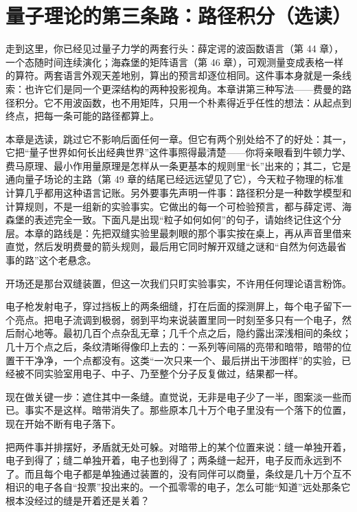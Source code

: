 \chapter{量子理论的第三条路：路径积分（选读）}

走到这里，你已经见过量子力学的两套行头：薛定谔的波函数语言（第 44 章），一个态随时间连续演化；海森堡的矩阵语言（第 46 章），可观测量变成表格一样的算符。两套语言外观天差地别，算出的预言却逐位相同。这件事本身就是一条线索：也许它们是同一个更深结构的两种投影视角。本章讲第三种写法——费曼的路径积分。它不用波函数，也不用矩阵，只用一个朴素得近乎任性的想法：从起点到终点，把每一条可能的路径都算上。

本章是选读，跳过它不影响后面任何一章。但它有两个别处给不了的好处：其一，它把“量子世界如何长出经典世界”这件事照得最清楚——你将亲眼看到牛顿力学、费马原理、最小作用量原理是怎样从一条更基本的规则里“长”出来的；其二，它是通向量子场论的主路（第 49 章的结尾已经远远望见了它），今天粒子物理的标准计算几乎都用这种语言记账。另外要事先声明一件事：路径积分是一种数学模型和计算规则，不是一组新的实验事实。它做出的每一个可检验预言，都与薛定谔、海森堡的表述完全一致。下面凡是出现“粒子如何如何”的句子，请始终记住这个分层。本章的路线是：先把双缝实验里最刺眼的那个事实按在桌上，再从声音里借来直觉，然后发明费曼的箭头规则，最后用它同时解开双缝之谜和“自然为何选最省事的路”这个老悬念。


开场还是那台双缝装置，但这一次我们只盯实验事实，不许用任何理论语言粉饰。

电子枪发射电子，穿过挡板上的两条细缝，打在后面的探测屏上，每个电子留下一个亮点。把电子流调到极弱，弱到平均来说装置里同一时刻至多只有一个电子，然后耐心地等。最初几百个点杂乱无章；几千个点之后，隐约露出深浅相间的条纹；几十万个点之后，条纹清晰得像印上去的：一系列等间隔的亮带和暗带，暗带的位置干干净净，一个点都没有。这类“一次只来一个、最后拼出干涉图样”的实验，已经被不同实验室用电子、中子、乃至整个分子反复做过，结果都一样。

现在做关键一步：遮住其中一条缝。直觉说，无非是电子少了一半，图案淡一些而已。事实不是这样。暗带消失了。那些原本几十万个电子里没有一个落下的位置，现在开始不断有电子落下。

把两件事并排摆好，矛盾就无处可躲。对暗带上的某个位置来说：缝一单独开着，电子到得了；缝二单独开着，电子也到得了；两条缝一起开，电子反而永远到不了。而且每个电子都是单独通过装置的，没有同伴可以商量，条纹是几十万个互不相识的电子各自“投票”投出来的。一个孤零零的电子，怎么可能“知道”远处那条它根本没经过的缝是开着还是关着？

